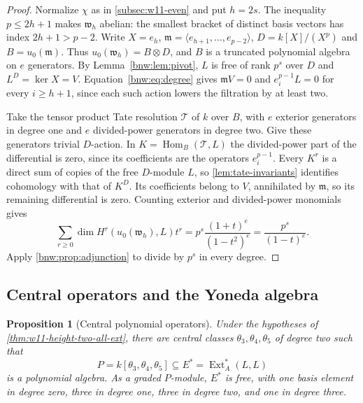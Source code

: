 \documentclass[11pt,reqno]{amsart}
\newtheorem{proposition}[proposition]{Proposition}
\theoremstyle{definition}
\theoremstyle{remark}
\theoremstyle{definition}
\newcommand{\Hom}{\operatorname{Hom}}
\newcommand{\Ext}{\operatorname{Ext}}
\begin{document}
\begin{proof}
Normalize $\chi$ as in \cref{subsec:w11-even} and put $h=2s$.
The inequality $p\le2h+1$ makes $\mathfrak w_h$ abelian:
the smallest bracket of distinct basis vectors has index $2h+1>p-2$.
Write $X=e_h$, $\mathfrak m=\langle e_{h+1},\ldots,e_{p-2}\rangle$,
$D=k[X]/(X^p)$ and $B=u_0(\mathfrak m)$.
Thus $u_0(\mathfrak w_h)=B\otimes D$, and $B$ is a truncated
polynomial algebra on $e$ generators. By Lemma~\ref{bnw:lem:pivot},
$L$ is free of rank $p^s$ over $D$ and $L^D=\ker X=V$.
Equation~\eqref{bnw:eq:degree} gives $\mathfrak m V=0$ and
$e_i^{p-1}L=0$ for every $i\ge h+1$, since each such action lowers
the filtration by at least two.

Take the tensor product Tate resolution $\mathcal T$ of $k$ over $B$,
with $e$ exterior generators in degree one and $e$ divided-power
generators in degree two. Give these generators trivial $D$-action.
In $K=\Hom_B(\mathcal T,L)$ the
 divided-power part of the differential is zero, since its coefficients
are the operators $e_i^{p-1}$.
Every $K^r$ is a direct sum of copies of the free $D$-module $L$,
so \cref{lem:tate-invariants} identifies cohomology with that of $K^D$. Its coefficients belong to
$V$, annihilated by $\mathfrak m$, so its remaining differential is zero.
Counting exterior and divided-power monomials gives
\[
 \sum_{r\ge0}\dim H^r(u_0(\mathfrak w_h),L)t^r
 =p^s\frac{(1+t)^e}{(1-t^2)^e}=\frac{p^s}{(1-t)^e}.
\]
Apply \cref{bnw:prop:adjunction} to divide by $p^s$ in every degree.
\end{proof}


\subsection{Central operators and the Yoneda algebra}

\begin{proposition}[Central polynomial operators]
\label{prop:w11-p7-central-operators}
Under the hypotheses of \cref{thm:w11-height-two-all-ext}, there are
central classes $\theta_3,\theta_4,\theta_5$ of degree two such that
\[
 P=k[\theta_3,\theta_4,\theta_5]\subseteq
 E^*=\Ext_A^*(L,L)
\]
is a polynomial algebra. As a graded $P$-module, $E^*$ is free,
with one basis element in degree zero, three in degree one,
three in degree two, and one in degree three.
\end{proposition}
\end{document}
